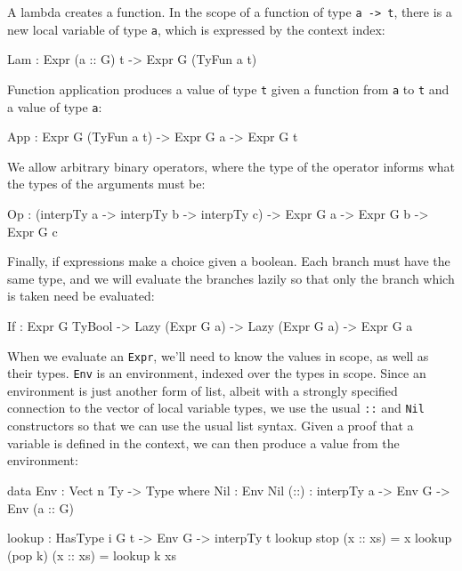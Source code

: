 \noindent
A lambda creates a function.
In the scope of a function of type \texttt{a -> t}, there is a new local variable of type \texttt{a}, which is expressed by the context index:

\begin{code}
Lam : Expr (a :: G) t -> Expr G (TyFun a t)
\end{code}

\noindent
Function application produces a value of type \texttt{t} given a function from  \texttt{a} to \texttt{t} and a value of type \texttt{a}:

\begin{code}
App : Expr G (TyFun a t) -> Expr G a -> Expr G t
\end{code}

\noindent
We allow arbitrary binary operators, where the type of the operator informs what the types of the arguments must be:

\begin{code}
Op  : (interpTy a -> interpTy b -> interpTy c) -> Expr G a -> Expr G b -> 
      Expr G c
\end{code}

\noindent
Finally, if expressions make a choice given a boolean.
Each branch must have the same type, and we will evaluate the branches
lazily so that only the branch which is taken need be evaluated:

\begin{code}
If  : Expr G TyBool -> Lazy (Expr G a) -> Lazy (Expr G a) -> Expr G a
\end{code}

\noindent
When we evaluate an \texttt{Expr}, we'll need to know the values in scope, as well as their types.
\texttt{Env} is an environment, indexed over the types in scope.
Since an environment is just another form of list, albeit with a strongly specified connection to the vector of local variable types, we use the usual \texttt{::} and \texttt{Nil} constructors so that we can use the usual list syntax.
Given a proof that a variable is defined in the context, we can then produce a value from the environment:

\begin{code}
data Env : Vect n Ty -> Type where
    Nil  : Env Nil
    (::) : interpTy a -> Env G -> Env (a :: G)

lookup : HasType i G t -> Env G -> interpTy t
lookup stop    (x :: xs) = x
lookup (pop k) (x :: xs) = lookup k xs
\end{code}

